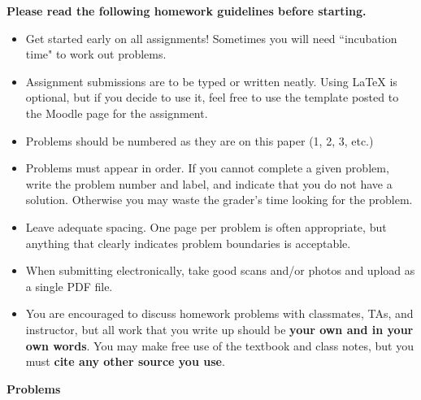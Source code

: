 \documentclass[11pt]{article}
\begin{document}
\assignmentnametitlestuff


\if{}
\textbf{Please read the following homework guidelines before starting.}

\begin{itemize}
\item Get started early on all assignments! Sometimes you will need ``incubation time" to work out problems.
\item Assignment submissions are to be typed or written neatly. Using \LaTeX{} is optional, but if you decide to use it, feel free to use the template posted to the Moodle page for the assignment.
\item Problems should be numbered as they are on this paper (1, 2, 3, etc.)
\item Problems must appear in order. If you cannot complete a given problem, write the problem number and label, and indicate that you do not have a solution. Otherwise you may waste the grader's time looking for the problem.
\item Leave adequate spacing. One page per problem is often appropriate, but anything that clearly indicates problem boundaries is acceptable.
\item When submitting electronically, take good scans and/or photos and upload as a single PDF file.
\item You are encouraged to discuss homework problems with classmates, TAs, and instructor, but all work that you
write up should be {\bf your own and in your own words}. 
You may make free use of the textbook and class notes, but you must {\bf cite any other
source you use}.
\end{itemize}

\textbf{Problems}
\fi
\end{document}
